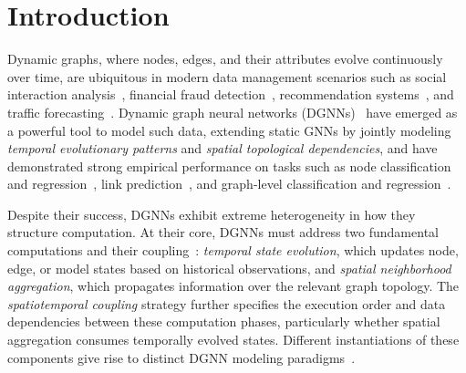 

\section{Introduction}
\label{sec:intro}


Dynamic graphs, where nodes, edges, and their attributes evolve continuously over time, are ubiquitous in modern data management scenarios such as social interaction analysis~\cite{social1}, financial fraud detection~\cite{finan1}, recommendation systems~\cite{recommand1, recommand2}, and traffic forecasting~\cite{traffic2}. 
Dynamic graph neural networks (DGNNs)~\cite{dgnn_dt1,dgnn_ct1} have emerged as a powerful tool to model such data, extending static GNNs by jointly modeling  {\em temporal evolutionary patterns} and {\em spatial topological dependencies}, and have demonstrated strong empirical performance on tasks such as node classification and regression~\cite{song2024dynahb}, link prediction~\cite{rossi2006temporal,zhou2022tgl,wang2024tglite}, and graph-level classification and regression~\cite{graph_cls1}. 

Despite their success, DGNNs exhibit extreme heterogeneity in how they structure computation.
At their core, DGNNs must address two fundamental computations and their coupling~\cite{2stage1}:
\emph{temporal state evolution}, which updates node, edge, or model states based on historical observations, and
\emph{spatial neighborhood aggregation}, which propagates information over the relevant graph topology.
The \emph{spatiotemporal coupling} strategy further specifies the execution order and data dependencies between these computation phases, particularly whether spatial aggregation consumes temporally evolved states. 
Different instantiations of these components give rise to distinct DGNN modeling paradigms~\cite{mult_paradigm1}.

